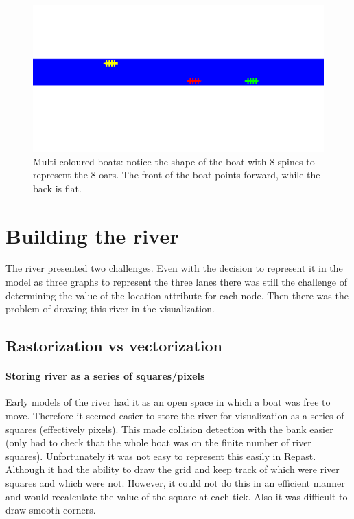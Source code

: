       \begin{figure}
      \begin{center}
        \includegraphics[scale=0.3]{images/boats.png}
        \caption{Multi-coloured boats: notice the shape of the boat with 8 spines to represent the 8 oars. The front of the boat points forward, while the back is flat.}
        \label{techissues:fig:boats}
      \end{center}
      \end{figure}
  
  \section{Building the river}\label{techissues:river}
    The river presented two challenges. Even with the decision to represent it in the model as three graphs to represent the three lanes there was still the challenge of determining the value of the location attribute for each node. Then there was the problem of drawing this river in the visualization.
    
    \subsection{Rastorization vs vectorization}
    
      \paragraph{Storing river as a series of squares/pixels}
      Early models of the river had it as an open space in which a boat was free to move. Therefore it seemed easier to store the river for visualization as a series of squares (effectively pixels). This made collision detection with the bank easier (only had to check that the whole boat was on the finite number of river squares). Unfortunately it was not easy to represent this easily in Repast. Although it had the ability to draw the grid and keep track of which were river squares and which were not. However, it could not do this in an efficient manner and would recalculate the value of the square at each tick. Also it was difficult to draw smooth corners.
      
